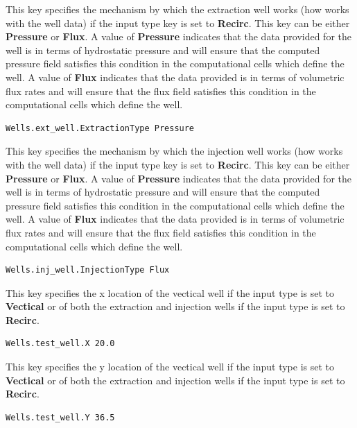 {
This key specifies the mechanism by which the extraction well works (how
\parflow{} works with the well data) if the input type key is set to
{\bf Recirc}.  This key can be either {\bf Pressure} or {\bf Flux}.  A
value of {\bf Pressure} indicates that the data provided for the well is
in terms of hydrostatic pressure and \parflow{} will ensure that the
computed pressure field satisfies this condition in the computational
cells which define the well.  A value of {\bf Flux} indicates that the
data provided is in terms of volumetric flux rates and \parflow{} will
ensure that the flux field satisfies this condition in the computational
cells which define the well.
}
\begin{display}\begin{verbatim}
Wells.ext_well.ExtractionType Pressure
\end{verbatim}\end{display}

{
This key specifies the mechanism by which the injection well works (how
\parflow{} works with the well data) if the input type key is set to
{\bf Recirc}.  This key can be either {\bf Pressure} or {\bf Flux}.  A
value of {\bf Pressure} indicates that the data provided for the well is
in terms of hydrostatic pressure and \parflow{} will ensure that the
computed pressure field satisfies this condition in the computational
cells which define the well.  A value of {\bf Flux} indicates that the
data provided is in terms of volumetric flux rates and \parflow{} will
ensure that the flux field satisfies this condition in the computational
cells which define the well.
}
\begin{display}\begin{verbatim}
Wells.inj_well.InjectionType Flux
\end{verbatim}\end{display}

{
This key specifies the x location of the vectical well if the input
type is set to {\bf Vectical} or of both the extraction and injection
wells if the input type is set to {\bf Recirc}.
}
\begin{display}\begin{verbatim}
Wells.test_well.X 20.0
\end{verbatim}\end{display}

{
This key specifies the y location of the vectical well if the input
type is set to {\bf Vectical} or of both the extraction and injection
wells if the input type is set  to {\bf Recirc}.
}
\begin{display}\begin{verbatim}
Wells.test_well.Y 36.5
\end{verbatim}\end{display}

